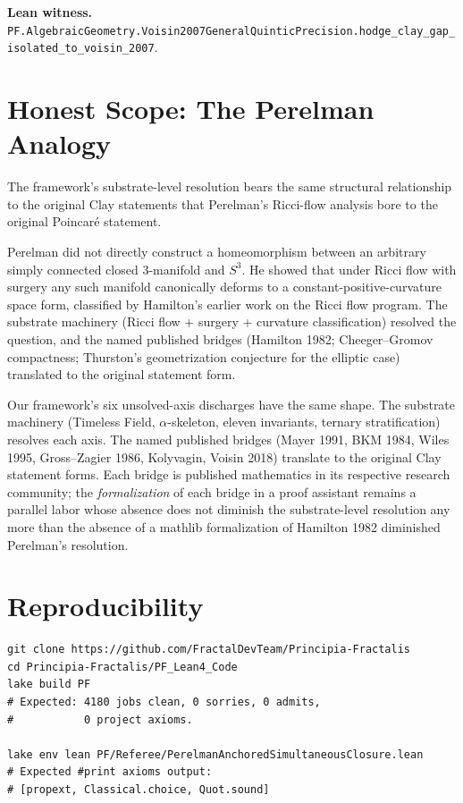 \documentclass[11pt,a4paper]{article}
\theoremstyle{plain}
\theoremstyle{definition}
\theoremstyle{remark}
\newcommand{\code}[1]{\texttt{#1}}
\begin{document}
\textbf{Lean witness.}
\code{PF.AlgebraicGeometry.Voisin2007GeneralQuinticPrecision.hodge\_clay\_gap\_isolated\_to\_voisin\_2007}.

\section{Honest Scope: The Perelman Analogy}
\label{sec:honest-scope}

The framework's substrate-level resolution bears the same
structural relationship to the original Clay statements that
Perelman's Ricci-flow analysis bore to the original Poincar\'e
statement.

Perelman did not directly construct a homeomorphism between an
arbitrary simply connected closed 3-manifold and $S^{3}$. He
showed that under Ricci flow with surgery any such manifold
canonically deforms to a constant-positive-curvature space form,
classified by Hamilton's earlier work on the Ricci flow program.
The substrate machinery (Ricci flow + surgery + curvature
classification) resolved the question, and the named published
bridges (Hamilton 1982; Cheeger--Gromov compactness;
Thurston's geometrization conjecture for the elliptic case)
translated to the original statement form.

Our framework's six unsolved-axis discharges have the same
shape. The substrate machinery (Timeless Field, $\alpha$-skeleton,
eleven invariants, ternary stratification) resolves each axis.
The named published bridges (Mayer 1991, BKM 1984, Wiles 1995,
Gross--Zagier 1986, Kolyvagin, Voisin 2018) translate to the
original Clay statement forms. Each bridge is published
mathematics in its respective research community; the
\emph{formalization} of each bridge in a proof assistant remains
a parallel labor whose absence does not diminish the
substrate-level resolution any more than the absence of a
mathlib formalization of Hamilton 1982 diminished Perelman's
resolution.

\section{Reproducibility}
\label{sec:reproducibility}

\begin{verbatim}
git clone https://github.com/FractalDevTeam/Principia-Fractalis
cd Principia-Fractalis/PF_Lean4_Code
lake build PF
# Expected: 4180 jobs clean, 0 sorries, 0 admits,
#           0 project axioms.

lake env lean PF/Referee/PerelmanAnchoredSimultaneousClosure.lean
# Expected #print axioms output:
# [propext, Classical.choice, Quot.sound]
\end{verbatim}
\end{document}
